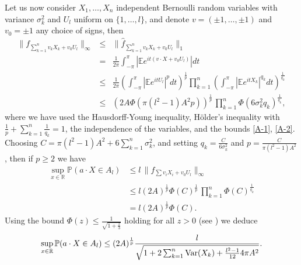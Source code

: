 \documentclass[11pt]{article}
\newcommand{\R}{\mathbb{R}}
\DeclareMathOperator{\Var}{Var}
\newcommand{\1}{[1]}
\def\Var{{\rm Var}}
\begin{document}
Let us now consider $X_1, \dots, X_n$ independent Bernoulli random variables with variance $\sigma_k^2$ and $U_l$ uniform on $\{1, \dots, l\}$, and denote $v=(\pm1, \dots, \pm 1)$ and $v_0=\pm 1$ any choice of signs, then
\begin{eqnarray*}
\|f_{\sum_{k=1}^n v_k X_k + v_0 U_l}\|_{\infty} & \leq & \|\widehat{f}_{\sum_{k=1}^n v_k X_k + v_0 U_l}\|_{1} \\ & = & \frac 1 { 2\pi } \int_{- \pi}^{\pi} \left| \mathbb{E} e^{i t (v \cdot X  + v_0 U_l)} \right| dt \\ & \leq & \frac{1}{2 \pi} \left(\int_{- \pi}^{\pi} \left|\mathbb{E} e^{it U_l}\right|^p dt \right)^{\frac 1 p} \prod_{k=1}^n \left(\int_{-\pi}^{\pi} \left| \mathbb{E} e^{it X_k} \right|^{q_k} dt \right)^{\frac 1 {q_k}} \\ & \leq &  \left( 2A \Phi (\pi (l^2 -1) A^2 p) \right)^{\frac{1}{p}} \, \prod_{k=1}^n \Phi \left( 6 \sigma_k^2 q_k \right)^{\frac{1}{q_k}},
\end{eqnarray*}
where we have used the Hausdorff-Young inequality, H\"older's inequality with $\frac 1 p + \sum_{k=1}^n \frac 1 {q_k} = 1$,  the independence of the variables, and the bounds \eqref{A-1}, \eqref{A-2}. Choosing $C = \pi (l^2-1)A^2 + 6 \sum_{k=1}^n \sigma_k^2$, and setting $q_k = \frac{C}{6 \sigma_k^2}  $ and $p = \frac{C}{\pi (l^2-1) A^2}$, then if $p \geq 2$ we have
\begin{align*}
        \sup_{x \in \R} \mathbb{P}(a \cdot X \in A_l)
            &\leq 
                l \, \|f_{\sum v_i X_i + v_0 U_l}\|_{\infty}
                    \\
            & \leq l (2A)^{\frac{1}{p}} \Phi (C) ^{\frac{1}{p}} \, \prod_{k=1}^n \Phi \left( C \right)^{\frac{1}{q_k}}\\
            &=
                l (2A)^{\frac{1}{p}} \Phi(C).
\end{align*}
Using the bound $\Phi(z) \leq \frac{1}{\sqrt{1+\frac{z}{3}}}$ holding for all $z > 0$ (see \cite[Lemma 2.9]{MMR})
we deduce
\begin{equation}\label{Bern}
\sup_{x \in \R} \mathbb{P}(a \cdot X \in A_l) \leq  (2A)^{\frac{1}{p}} \frac{l}{\sqrt{1 + 2 \sum_{k=1}^n \Var(X_k) + \frac{l^2-1}{12} 4 \pi A^2} }.
\end{equation}
\end{document}
